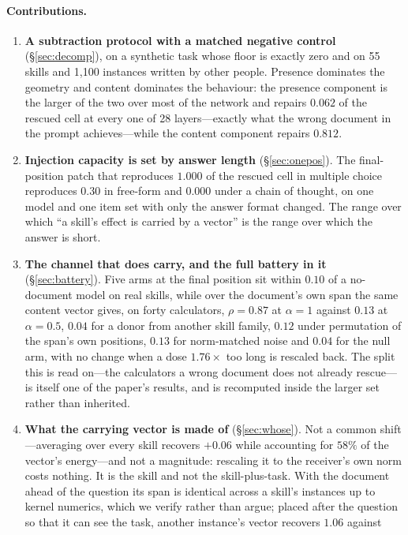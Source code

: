 \documentclass{article}
\begin{document}
\paragraph{Contributions.}
\begin{enumerate}
\item \textbf{A subtraction protocol with a matched negative control}
(\S\ref{sec:decomp}), on a synthetic task whose floor is exactly zero and on 55
skills and 1{,}100 instances written by other people. Presence dominates the
geometry and content dominates the behaviour: the presence component is the
larger of the two over most of the network and repairs $0.062$ of the rescued
cell at every one of 28 layers---exactly what the wrong document in the prompt
achieves---while the content component repairs $0.812$.
\item \textbf{Injection capacity is set by answer length} (\S\ref{sec:onepos}).
The final-position patch that reproduces $1.000$ of the rescued cell in multiple
choice reproduces $0.30$ in free-form and $0.000$ under a chain of thought, on
one model and one item set with only the answer format changed. The range over
which ``a skill's effect is carried by a vector'' is the range over which the
answer is short.
\item \textbf{The channel that does carry, and the full battery in it}
(\S\ref{sec:battery}). Five arms at the final position sit within $0.10$ of a
no-document model on real skills, while over the document's own span the same
content vector gives, on forty calculators, $\rho = 0.87$ at $\alpha=1$ against
$0.13$ at $\alpha=0.5$, $0.04$ for a donor from another skill family, $0.12$
under permutation of the span's own positions, $0.13$ for norm-matched noise and
$0.04$ for the null arm, with no change when a dose $1.76\times$ too long is
rescaled back. The split this is read on---the calculators a wrong document does
not already rescue---is itself one of the paper's results, and is recomputed
inside the larger set rather than inherited.
\item \textbf{What the carrying vector is made of} (\S\ref{sec:whose}). Not a
common shift---averaging over every skill recovers $+0.06$ while accounting for
$58\%$ of the vector's energy---and not a magnitude: rescaling it to the
receiver's own norm costs nothing. It is the skill and not the skill-plus-task.
With the document ahead of the question its span is identical across a
skill's instances up to kernel numerics, which we verify rather than argue; placed after the question
so that it can see the task, another instance's vector recovers $1.06$ against

\end{enumerate}
\end{document}
